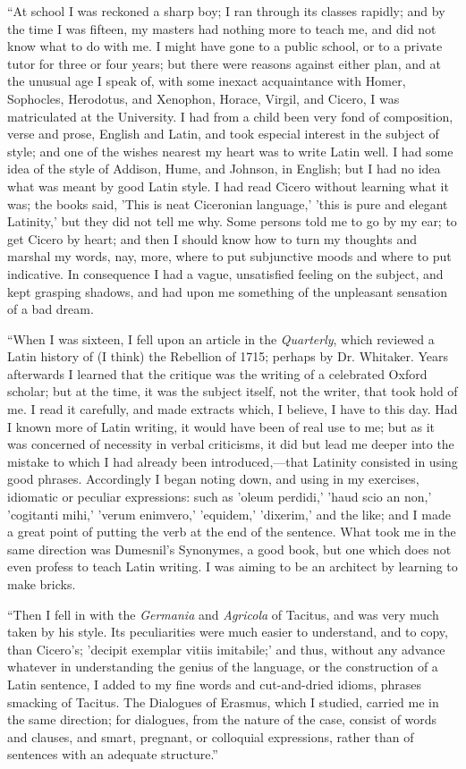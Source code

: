 ``At school I was reckoned a sharp boy; I ran through its
classes rapidly; and by the time I was fifteen, my masters had nothing
more to teach me, and did not know what to do with me. I might have
gone to a public school, or to a private tutor for three or four
years; but there were reasons against either plan, and at the unusual
age I speak of, with some inexact acquaintance with Homer, Sophocles,
Herodotus, and Xenophon, Horace, Virgil, and Cicero, I was
matriculated at the University. I had from a child been very fond of
composition, verse and prose, English and Latin, and took especial
interest in the subject of style; and one of the wishes nearest my
heart was to write Latin well. I had some idea of the style of
Addison, Hume, and Johnson, in English; but I had no idea what was
meant by good Latin style. I had read Cicero without learning what it
was; the books said, 'This is neat Ciceronian language,' 'this is pure
and elegant Latinity,' but they did not tell me why. Some persons told
me to go by my ear; to get Cicero by heart; and then I should know how
to turn my thoughts and marshal my words, nay, more, where to put
subjunctive moods and where to put indicative. In consequence I had a
vague, unsatisfied feeling on the subject, and kept grasping shadows,
and had upon me something of the unpleasant sensation of a bad dream.

``When I was sixteen, I fell upon an article in the \emph{Quarterly},
which reviewed a Latin history of (I think) the Rebellion of 1715;
perhaps by Dr. Whitaker. Years afterwards I learned that the
critique was the writing of a celebrated Oxford scholar; but at the
time, it was the subject itself, not the writer, that took hold of me.
I read it carefully, and made extracts which, I believe, I have to
this day. Had I known more of Latin writing, it would have been of
real use to me; but as it was concerned of necessity in verbal
criticisms, it did but lead me deeper into the mistake to which I had
already been introduced,—that Latinity consisted in using good
phrases. Accordingly I began noting down, and using in my exercises,
idiomatic or peculiar expressions: such as 'oleum perdidi,' 'haud scio
an non,' 'cogitanti mihi,' 'verum enimvero,' 'equidem,' 'dixerim,' and
the like; and I made a great point of putting the verb at the end of
the sentence. What took me in the same direction was Dumesnil's
Synonymes, a good book, but one which does not even profess to teach
Latin writing. I was aiming to be an architect by learning to make
bricks.

``Then I fell in with the \emph{Germania} and \emph{Agricola}
of Tacitus, and was very much taken by his style. Its peculiarities
were much easier to understand, and to copy, than Cicero's; 'decipit
exemplar vitiis imitabile;' and thus, without any advance whatever in
understanding the genius of the language, or the construction of a
Latin sentence, I added to my fine words and cut-and-dried idioms,
phrases smacking of Tacitus. The Dialogues of Erasmus, which I
studied, carried me in the same direction; for dialogues, from the
nature of the case, consist of words and clauses, and smart, pregnant,
or colloquial expressions, rather than of sentences with an adequate
structure.''

